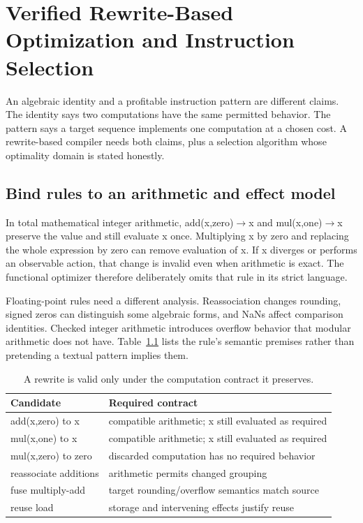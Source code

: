 \chapter{Verified Rewrite-Based Optimization and Instruction Selection}
\label{ch:rewrite-optimization}

An algebraic identity and a profitable instruction pattern are different claims.
The identity says two computations have the same permitted behavior.
The pattern says a target sequence implements one computation at a chosen cost.
A rewrite-based compiler needs both claims, plus a selection algorithm whose optimality domain is stated honestly.

\section{Bind rules to an arithmetic and effect model}
\label{sec:ch88-semantics}
In total mathematical integer arithmetic, add(x,zero)$\to$x and mul(x,one)$\to$x preserve the value and still evaluate x once.
Multiplying x by zero and replacing the whole expression by zero can remove evaluation of x.
If x diverges or performs an observable action, that change is invalid even when arithmetic is exact.
The functional optimizer therefore deliberately omits that rule in its strict language.

Floating-point rules need a different analysis.
Reassociation changes rounding, signed zeros can distinguish some algebraic forms, and NaNs affect comparison identities.
Checked integer arithmetic introduces overflow behavior that modular arithmetic does not have.
Table~\ref{tab:ch88-rules} lists the rule's semantic premises rather than pretending a textual pattern implies them.

\begin{table}[htbp]
\caption{A rewrite is valid only under the computation contract it preserves.}
\label{tab:ch88-rules}
\centering
\begin{tabular}{ll}
\toprule
Candidate & Required contract \\
\midrule
add(x,zero) to x & compatible arithmetic; x still evaluated as required \\
mul(x,one) to x & compatible arithmetic; x still evaluated as required \\
mul(x,zero) to zero & discarded computation has no required behavior \\
reassociate additions & arithmetic permits changed grouping \\
fuse multiply-add & target rounding/overflow semantics match source \\
reuse load & storage and intervening effects justify reuse \\
\bottomrule
\end{tabular}
\end{table}

